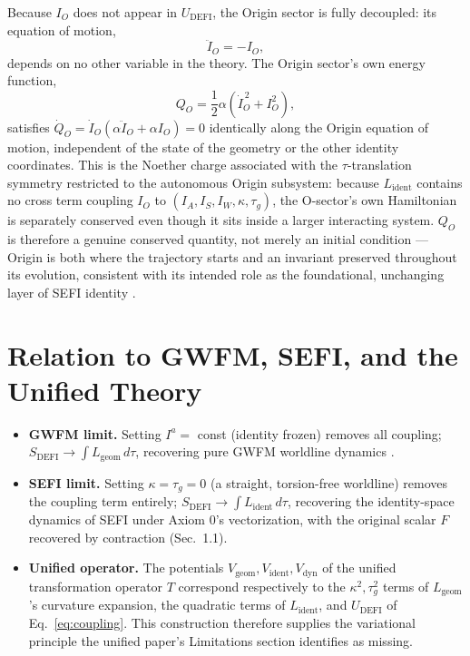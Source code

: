 \documentclass[aip,jmp,reprint,onecolumn,nofootinbib]{revtex4-2}
\begin{document}
Because $I_O$ does not appear in $U_{\text{DEFI}}$, the Origin sector is fully
decoupled: its equation of motion,
\begin{equation}
\ddot I_O = -I_O,
\end{equation}
depends on no other variable in the theory. The Origin sector's own energy
function,
\begin{equation}
Q_O = \frac{1}{2}\alpha\left(\dot I_O^{\,2} + I_O^2\right),
\end{equation}
satisfies $\dot Q_O = \dot I_O\left(\alpha \ddot I_O + \alpha I_O\right) = 0$
identically along the Origin equation of motion, independent of the state of the
geometry or the other identity coordinates. This is the Noether charge
\cite{Noether1918,Noether1971} associated
with the $\tau$-translation symmetry restricted to the autonomous Origin
subsystem: because $L_\text{ident}$ contains no cross term coupling $I_O$ to
$(I_A,I_S,I_W,\kappa,\tau_g)$, the O-sector's own Hamiltonian is separately
conserved even though it sits inside a larger interacting system. $Q_O$ is
therefore a genuine conserved quantity, not merely an initial condition — Origin
is both where the trajectory starts and an invariant preserved throughout its
evolution, consistent with its intended role as the foundational, unchanging
layer of SEFI identity \cite{DuttonSEFI2026}.

\section{Relation to GWFM, SEFI, and the Unified Theory}

\begin{itemize}
\item \textbf{GWFM limit.} Setting $I^a=$ const (identity frozen) removes all
coupling; $S_{\text{DEFI}}\to \int L_{\text{geom}}\,d\tau$, recovering pure GWFM
worldline dynamics \cite{DuttonElectronField2026}.
\item \textbf{SEFI limit.} Setting $\kappa=\tau_g=0$ (a straight, torsion-free
worldline) removes the coupling term entirely; $S_{\text{DEFI}}\to\int
L_{\text{ident}}\,d\tau$, recovering the identity-space dynamics of SEFI under
Axiom 0's vectorization, with the original scalar $F$ recovered by contraction
(Sec.~1.1).
\item \textbf{Unified operator.} The potentials $V_{\text{geom}}, V_{\text{ident}},
V_{\text{dyn}}$ of the unified transformation operator $T$
\cite{DuttonUnified2026} correspond respectively to the $\kappa^2,\tau_g^2$ terms
of $L_{\text{geom}}$'s curvature expansion, the quadratic terms of
$L_{\text{ident}}$, and $U_{\text{DEFI}}$ of Eq.~\eqref{eq:coupling}. This
construction therefore supplies the variational principle the unified paper's
Limitations section identifies as missing.
\end{itemize}
\end{document}
